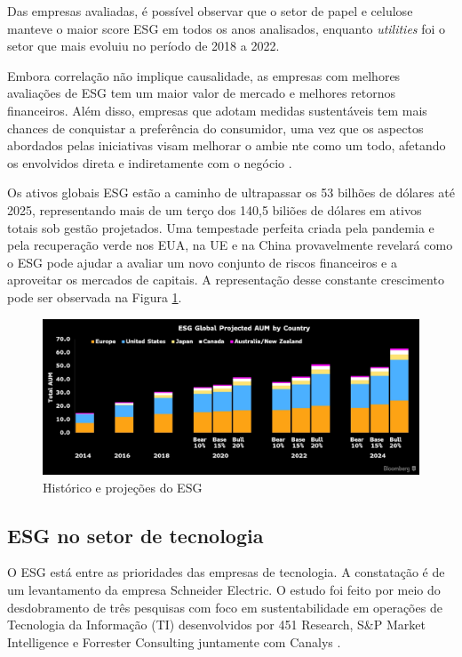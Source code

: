 \documentclass[12pt]{article}
\begin{document}
	Das empresas avaliadas, é possível observar que o setor de papel e celulose manteve o maior score ESG em todos os anos analisados, enquanto \emph{utilities} foi o setor que mais evoluiu no período de 2018 a 2022.
	

	
	Embora correlação não implique causalidade, as empresas com melhores avaliações de ESG tem um maior valor de mercado e melhores retornos financeiros. Além disso, empresas que adotam medidas sustentáveis tem mais chances de conquistar a preferência do consumidor, uma vez que os aspectos abordados pelas iniciativas visam melhorar o ambie nte como um todo, afetando os envolvidos direta e indiretamente com o negócio \cite{cabralPraticasESGAplicadas2023}.
	
	
	Os ativos globais ESG estão a caminho de ultrapassar os 53 bilhões de dólares até 2025, representando mais de um terço dos 140,5 biliões de dólares em ativos totais sob gestão projetados. Uma tempestade perfeita criada pela pandemia e pela recuperação verde nos EUA, na UE e na China provavelmente revelará como o ESG pode ajudar a avaliar um novo conjunto de riscos financeiros e a aproveitar os mercados de capitais. A representação desse constante crescimento pode ser observada na Figura \ref{fig:projections}.
	
	\begin{figure}[h]
		\centering
		\includegraphics[scale=0.2]{pictures/esg-projections.png}
		\caption{Histórico e projeções do ESG}
		\label{fig:projections}
	\end{figure}
	
	\subsection*{ESG no setor de tecnologia}
	
	O ESG está entre as prioridades das empresas de tecnologia. A constatação é de um levantamento da empresa Schneider Electric. O estudo foi feito por meio do desdobramento de três pesquisas com foco em sustentabilidade em operações de Tecnologia da Informação (TI) desenvolvidos por 451 Research, S\&P Market Intelligence e Forrester Consulting juntamente com Canalys \cite{paceteESGPrioridadePara2022}.
	
\end{document}
